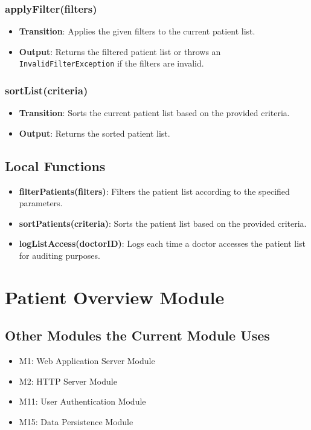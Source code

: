 \documentclass[12pt, titlepage]{article}
\begin{document}
\subsubsection{applyFilter(filters)}

\begin{itemize}
    \item \textbf{Transition}: Applies the given filters to the current patient list.
    \item \textbf{Output}: Returns the filtered patient list or throws an \texttt{InvalidFilterException} if the filters are invalid.
\end{itemize}

\subsubsection{sortList(criteria)}

\begin{itemize}
    \item \textbf{Transition}: Sorts the current patient list based on the provided criteria.
    \item \textbf{Output}: Returns the sorted patient list.
\end{itemize}

\subsection{Local Functions}
\begin{itemize}
\item \textbf{filterPatients(filters)}: Filters the patient list according to the specified parameters.
\item \textbf{sortPatients(criteria)}: Sorts the patient list based on the provided criteria.
\item \textbf{logListAccess(doctorID)}: Logs each time a doctor accesses the patient list for auditing purposes.
\end{itemize}
\section{Patient Overview Module}

\subsection{Other Modules the Current Module Uses}
\begin{itemize}
\item M1: Web Application Server Module
\item M2: HTTP Server Module
\item M11: User Authentication Module
\item M15: Data Persistence Module
\end{itemize}
\end{document}
